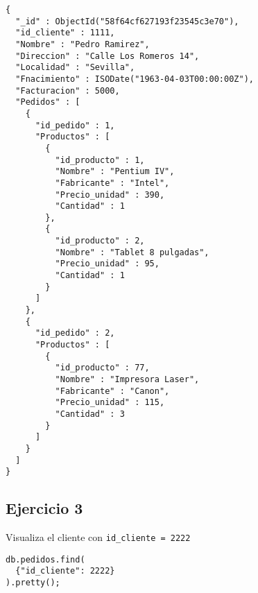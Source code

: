 \begin{lstlisting}
{
  "_id" : ObjectId("58f64cf627193f23545c3e70"),
  "id_cliente" : 1111,
  "Nombre" : "Pedro Ramirez",
  "Direccion" : "Calle Los Romeros 14",
  "Localidad" : "Sevilla",
  "Fnacimiento" : ISODate("1963-04-03T00:00:00Z"),
  "Facturacion" : 5000,
  "Pedidos" : [
    {
      "id_pedido" : 1,
      "Productos" : [
        {
          "id_producto" : 1,
          "Nombre" : "Pentium IV",
          "Fabricante" : "Intel",
          "Precio_unidad" : 390,
          "Cantidad" : 1
        },
        {
          "id_producto" : 2,
          "Nombre" : "Tablet 8 pulgadas",
          "Precio_unidad" : 95,
          "Cantidad" : 1
        }
      ]
    },
    {
      "id_pedido" : 2,
      "Productos" : [
        {
          "id_producto" : 77,
          "Nombre" : "Impresora Laser",
          "Fabricante" : "Canon",
          "Precio_unidad" : 115,
          "Cantidad" : 3
        }
      ]
    }
  ]
}	
\end{lstlisting}

\subsection{Ejercicio 3}

Visualiza el cliente con \texttt{id\_cliente = 2222}

\begin{lstlisting}
db.pedidos.find(
  {"id_cliente": 2222}
).pretty();
\end{lstlisting}

